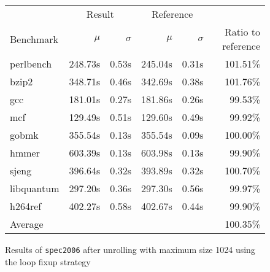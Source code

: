 \begin{figure}[h]
    \begin{center}
        \begin{tabular}{lrrrrr}
            \toprule
            & \multicolumn{2}{c}{Result} & \multicolumn{2}{c}{Reference}\\
            Benchmark & $\mu$ & $\sigma$ & $\mu$ & $\sigma$ & Ratio to reference\\
            \midrule
            perlbench & 248.73s & 0.53s & 245.04s & 0.31s & 101.51\%\\
            bzip2 & 348.71s & 0.46s & 342.69s & 0.38s & 101.76\%\\
            gcc & 181.01s & 0.27s & 181.86s & 0.26s & 99.53\%\\
            mcf & 129.49s & 0.51s & 129.60s & 0.49s & 99.92\%\\
            gobmk & 355.54s & 0.13s & 355.54s & 0.09s & 100.00\%\\
            hmmer & 603.39s & 0.13s & 603.98s & 0.13s & 99.90\%\\
            sjeng & 396.64s & 0.32s & 393.89s & 0.32s & 100.70\%\\
            libquantum & 297.20s & 0.36s & 297.30s & 0.56s & 99.97\%\\
            h264ref & 402.27s & 0.58s & 402.67s & 0.44s & 99.90\%\\
            \midrule
            Average & & & & & 100.35\%\\
            \bottomrule
        \end{tabular}
    \end{center}
    \caption{Results of \texttt{spec2006} after unrolling with maximum size 1024 using the loop fixup strategy}
    \label{fig:eval:perf:loop:1024}
\end{figure}